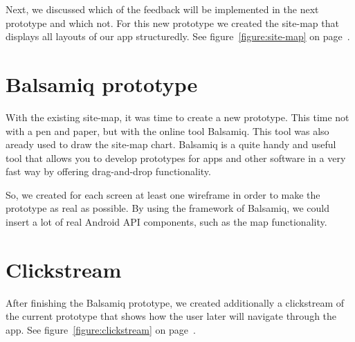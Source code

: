 \documentclass[11pt,twoside,a4paper]{report}
\begin{document}
Next, we discussed which of the feedback will be implemented in the next prototype and which not. For this new prototype we created the site-map that displays all layouts of our app structuredly. See figure~\ref{figure:site-map} on page~\pageref{figure:site-map}.

\section{Balsamiq prototype}

With the existing site-map, it was time to create a new prototype. This time not with a pen and paper, but with the online tool Balsamiq. This tool was also aready used to draw the site-map chart. Balsamiq is a quite handy and useful tool that allows you to develop prototypes for apps and other software in a very fast way by oﬀering drag-and-drop functionality.

So, we created for each screen at least one wireframe in order to make the prototype as real as possible. By using the framework of Balsamiq, we could
insert a lot of real Android API components, such as the map functionality.

\section{Clickstream}

After finishing the Balsamiq prototype, we created additionally a clickstream of the current prototype that shows how the user later will navigate through the app. See figure~\ref{figure:clickstream} on page~\pageref{figure:clickstream}.
\end{document}
